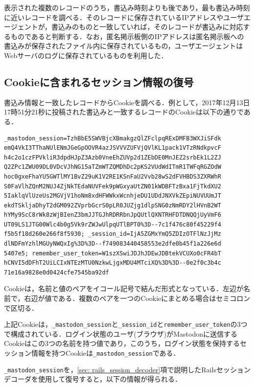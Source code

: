 \documentclass[10pt, a4paper]{jreport}
\begin{document}
表示された複数のレコードのうち，書込み時刻よりも後であり，最も書込み時刻に近いレコードを調べる．そのレコードに保存されているIPアドレスやユーザエージェントが，書込みのものと一致していれば，そのレコードが書込みに対応するものであると判断する．なお，匿名掲示板側のIPアドレスは匿名掲示板への書込みが保存されたファイル内に保存されているもの，ユーザエージェントはWebサーバのログに保存されているものを利用した．

\subsection{Cookieに含まれるセッション情報の復号}
書込み情報と一致したレコードからCookieを調べる．例として，2017年12月13日17時51分21秒に投稿された書込みと一致するレコードのCookieは以下の通りである．

\begin{verbatim}
_mastodon_session=TzhBbE5SWVBjcXBmakgzQlZFclpqRExDMFB3WXJiSFdk
emQ4VkI3TThaNUlENmJGeGpOOVR4azJSVVVZUFVjQVlKL1pack1VTzRNdkpvcF
h4c2o1czFPVkliR3dpdHJpZ3Azb0VneEhZUVp2d1ZEbDE0MnJEZ2srbEk1L2ZJ
Q2ZPc1ZWU09DL0VDcVJhNG15aTZmWTZQMDhDc2pKS2VUdWdITmR1TWFqRGZOdW
hoc0gxeFhaYU5GWTlMY1BvZ29uK1V2RE1KSnFaU2Vvb28wS2dFVHBDS3ZXRWhR
S0FaVlhZQnM2NUJ4ZjNkTEdaNUVFek9pWGxyaUtZN01kWDBFTzBxa1FjTkdXU2
5IaklqVlUzeUs2MGVjV1hoNm8xdHFWWkxWcnhjeDU1UDdJNXVkZEpiNUVUUmJT
ekdTSkljaDhyT2dGM092ZVprbGcrS0pLR0JUZjg1dlpSNG0zNmRDY2lHVnB2WT
hYMy9ScC8rWk8zWjBIenZ3bmJJTGJhRDRRbnJpQUtlQXNTRHFDTDNQQjUyVmF6
UT09LS1JTG00Wlc4b0g5Vk9rZWJwUlpqUTlBPT0%3D--7c1f476c80f45229f4
f5b5f18d260e266f8f5930; _session_id=IjA5ZGMxYmQ5ZDIzOTFlNzJjMz
dlNDFmYzhlMGUyNWQxIg%3D%3D--f749083440458553e2dfe0b45f1a226e6d
5407e5; remember_user_token=W1szXSwiJDJhJDEwJDBtekVCUXo0cFR4bT
hCNVI5dDFhT2UiLCIxNTEzMTU0NzkwLjgxMDU4MTciXQ%3D%3D--0e2f0c3b4c
71e16a9828e0d0424cfe7545ba92df
\end{verbatim}

Cookieは，名前と値のペアをイコール記号で結んだ形式となっている．左辺が名前で，右辺が値である．複数のペアを一つのCookieにまとめる場合はセミコロンで区切る．

上記Cookieは，\verb|_mastodon_session|と\verb|_session_id|と\verb|remember_user_token|の3つで構成されている．ログイン状態のユーザ(ブラウザ)がMastodonに送信するCookieはこの3つの名前を持つ値であり，このうち，ログイン状態を保持するセッション情報を持つCookieは\verb|_mastodon_session|である．

\verb|_mastodon_session|を，\ref{sec: rails_session_decoder}項で説明したRailsセッションデコーダを使用して復号すると，以下の情報が得られる．
\end{document}
